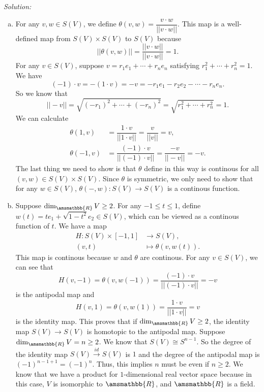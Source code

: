 \documentclass[a4paper, 12pt]{article}
\newenvironment{solution}
    {\textit{Solution:}}
    {}
\renewcommand{\mathbb}{\amsmathbb}
\begin{document}
\begin{solution}
\begin{enumerate}[(a)]
\item For any \(v,w\in S(V)\), we define \(\theta(v,w)=\dfrac{v\cdot w}{||v\cdot w||}\). This map is a well-defined map from \(S(V)\times S(V)\) to \(S(V)\) because 
\[||\theta(v,w)||=\dfrac{||v\cdot w||}{||v\cdot w||}=1.\]
For any \(v\in S(V)\), suppose \(v=r_1e_1+\cdots+r_ne_n\) satisfying \(r_1^2+\cdots+r_n^2=1\). We have 
\[(-1)\cdot v=-(1\cdot v)=-v=-r_1e_1-r_2e_2-\cdots-r_ne_n.\]
So we know that 
\[||-v||=\sqrt{(-r_1)^2+\cdots+(-r_n)^2}=\sqrt{r_1^2+\cdots+r_n^2}=1.\]
We can calculate 
\begin{align*}
    \theta(1,v)&=\dfrac{1\cdot v}{||1\cdot v||}=\dfrac{v}{||v||}=v,\\ 
    \theta(-1,v)&=\dfrac{(-1)\cdot v}{||(-1)\cdot v||}=\dfrac{-v}{||-v||}=-v.
\end{align*}
The last thing we need to show is that \(\theta\) define in this way is continous for all \((v,w)\in S(V)\times S(V)\). Since \(\theta\) is symmetric, we only need to show that for any \(w\in S(V)\), 
\(\theta(-,w):S(V)\rightarrow S(V)\) is a continous function. 
\item Suppose \(\dim_{\mathbb{R}}V\geq 2\). For any \(-1\leq t\leq 1\), define \(w(t)=te_1+\sqrt{1-t^2}e_2\in S(V)\), which can be viewed as a continous function of \(t\). We have a map 
\begin{align*}
    H:S(V)\times [-1,1]&\rightarrow S(V),\\ 
    (v,t)&\mapsto \theta(v,w(t)). 
\end{align*}
This map is continous because \(w\) and \(\theta\) are continous. For any \(v\in S(V)\), we can see that  
\[H(v,-1)=\theta(v,w(-1))=\dfrac{(-1)\cdot v}{||(-1)\cdot v||}=-v\]
is the antipodal map and 
\[H(v,1)=\theta(v,w(1))=\dfrac{1\cdot v}{||1\cdot v||}=v\]
is the identity map. This proves that if \(\dim_{\mathbb{R}}V\geq 2\), the identity map \(S(V)\rightarrow S(V)\) is homotopic to the antipodal map. Suppose \(\dim_{\mathbb{R}}V=n\geq 2\). We know that \(S(V)\cong S^{n-1}\). So 
the degree of the identity map \(S(V)\xrightarrow{id}S(V)\) is \(1\) and the degree of the antipodal map is \((-1)^{n-1+1}=(-1)^n\). Thus, this implies \(n\) must be even if \(n\geq 2\). We know that we have a product for \(1\)-dimensional 
real vector space because in this case, \(V\) is isomorphic to \(\mathbb{R}\), and \(\mathbb{R}\) is a field. 
\end{enumerate}
\end{solution}
\end{document}
